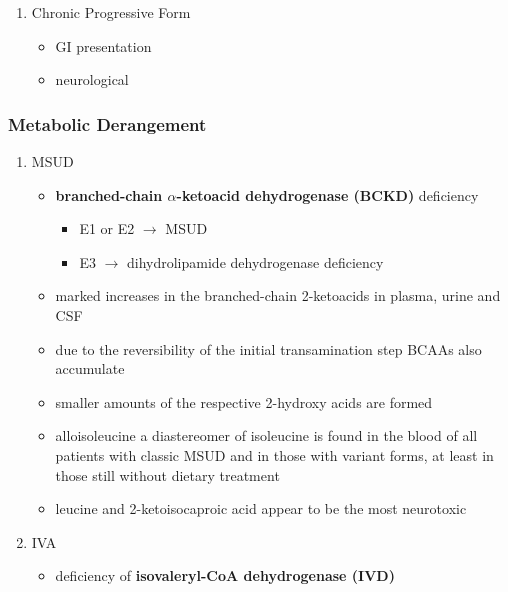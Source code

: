\documentclass{scrartcl}
\begin{document}
\begin{enumerate}
\item Chronic Progressive Form
\label{sec:org7c6c28d}
\begin{itemize}
\item GI presentation
\item neurological
\end{itemize}
\end{enumerate}

\subsubsection{Metabolic Derangement}
\label{sec:orged4fa5e}
\begin{enumerate}
\item MSUD
\label{sec:orga203e2d}
\begin{itemize}
\item \textbf{branched-chain \(\alpha\)-ketoacid dehydrogenase (BCKD)} deficiency
\begin{itemize}
\item E1 or E2 \(\to\) MSUD
\item E3 \(\to\) dihydrolipamide dehydrogenase deficiency
\end{itemize}
\end{itemize}




\begin{itemize}
\item marked increases in the branched-chain 2-ketoacids in plasma, urine
and CSF
\item due to the reversibility of the initial transamination step BCAAs
also accumulate
\item smaller amounts of the respective 2-hydroxy acids are formed
\item alloisoleucine a diastereomer of isoleucine is found in the blood of
all patients with classic MSUD and in those with variant forms, at
least in those still without dietary treatment
\item leucine and 2-ketoisocaproic acid appear to be the most neurotoxic
\end{itemize}

\item IVA
\label{sec:org42f5520}
\begin{itemize}
\item deficiency of \textbf{isovaleryl-CoA dehydrogenase (IVD)}
\end{itemize}


\end{enumerate}
\end{document}

